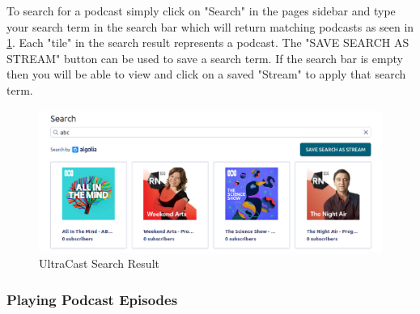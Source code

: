 \documentclass[../report.tex]{subfiles}
\begin{document}
To search for a podcast simply click on "Search" in the pages sidebar and type your search term in the search bar
which will return matching podcasts as seen in \cref{fig:UM_search_result}. Each "tile" in the search result represents
a podcast. The "SAVE SEARCH AS STREAM" button can be used to save a search term. If the search bar is empty then you 
will be able to view and click on a saved "Stream" to apply that search term.

\begin{figure}[ht] 
    \centering
    \includegraphics[width=16cm]{resources/UM_Search_Result}
    \caption{UltraCast Search Result}
    \label{fig:UM_search_result} 
\end{figure}

\newpage


\subsubsection{Playing Podcast Episodes} \label{sssec:UM_playing_episodes}
\end{document}

